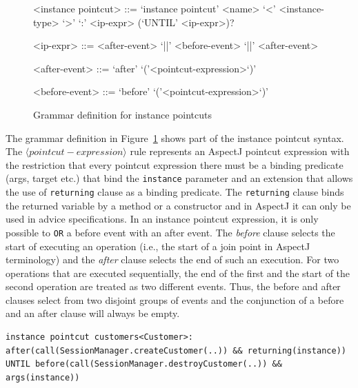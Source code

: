 \documentclass{acm_proc_article-sp}
\begin{document}
\begin{figure}[h!]
\begin{grammar}
<instance pointcut> ::= `instance pointcut' <name> `<' <instance-type> `>' `:'
<ip-expr> (`UNTIL' <ip-expr>)? 

<ip-expr> ::= <after-event> `||' <before-event>  `||' <after-event>  

<after-event> ::= `after' `('<pointcut-expression>`)'

<before-event> ::= `before' `('<pointcut-expression>`)'
\end{grammar}
\caption{Grammar definition for instance pointcuts}
\label{fig:grammar1}
\end{figure}

The grammar definition in Figure~\ref{fig:grammar1} shows part of the instance pointcut syntax. 
The $\langle pointcut-expression\rangle$ rule represents an AspectJ pointcut expression with the restriction that every pointcut expression there must be a binding predicate (args, target etc.) that bind the \texttt{instance} parameter and an extension that allows the use of \texttt{returning} clause as a binding predicate. The \texttt{returning} clause binds the returned variable by a method or a constructor and in AspectJ it can only be used in advice specifications. 
In an instance pointcut expression, it is only possible to \texttt{OR} a before event with an after event. 
The \emph{before} clause selects the start of executing an operation (i.e., the start of a join point in AspectJ terminology) and the \emph{after} clause selects the end of such an execution. 
For two operations that are executed sequentially, the end of the first and the start of the second operation are treated as two different events. Thus, the before and after clauses select from two disjoint groups of events and the conjunction of a before and an after clause will always be empty.



\begin{lstlisting}[float=h!, caption={A basic instance pointcut declaration with add and remove expressions}, label={lst:basic}]
instance pointcut customers<Customer>: after(call(SessionManager.createCustomer(..)) && returning(instance)) UNTIL before(call(SessionManager.destroyCustomer(..)) && args(instance))
\end{lstlisting}
\end{document}

